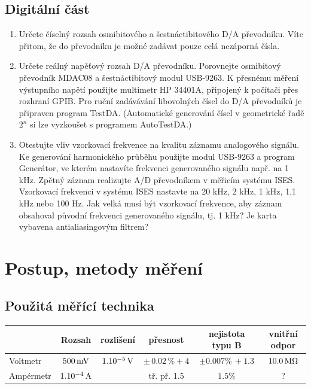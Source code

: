 \documentclass[czech,11pt,a4paper]{article}
\begin{document}
	\subsection{Digitální část}
		\begin{enumerate}
			\item Určete číselný rozsah osmibitového a šestnáctibitového D/A převodníku. Víte přitom, že do
			převodníku je možné zadávat pouze celá nezáporná čísla.
			\item Určete reálný napěťový rozsah D/A převodníku.
			Porovnejte osmibitový převodník MDAC08 a šestnáctibitový modul USB-9263. K přesnému
			měření výstupního napětí použijte multimetr HP 34401A, připojený k počítači přes rozhraní
			GPIB. Pro ruční zadávávání libovolných čísel do D/A převodníků je připraven program
			TestDA. (Automatické generování čísel v geometrické řadě $2^n$ si lze vyzkoušet s programem
			AutoTestDA.)
			\item Otestujte vliv vzorkovací frekvence na kvalitu záznamu analogového signálu. Ke generování
			harmonického průběhu použijte modul USB-9263 a program Generátor, ve kterém nastavíte
			frekvenci generovaného signálu např. na 1 kHz. Zpětný záznam realizujte A/D převodníkem
			v měřicím systému ISES. Vzorkovací frekvenci v systému ISES nastavte na 20 kHz, 2 kHz,
			1 kHz, 1,1 kHz nebo 100 Hz. Jak velká musí být vzorkovací frekvence, aby záznam obsahoval původní frekvenci generovaného signálu, tj. 1 kHz? Je karta vybavena antialiasingovým
			filtrem?
		\end{enumerate}
	
	
	
	\section{Postup, metody měření}
	
	\subsection{Použitá měřící technika}
	
	
		\begin{center}
			
			\begin{tabular}{||l|c|c|c|c|c||}
				\hline
				& Rozsah & rozlišení & přesnost & nejistota typu B & vnitřní odpor\\
				\hline
				{Voltmetr} &$500  \,\rm mV $& $1 . 10^{-5} \,\rm V$  & $\pm \, 0.02\, \%   +4$ &$\pm 0. 007\% \, + 1.3$&$10.0 \,\rm M \Omega$ \\
				\hline
				{Ampérmetr}  & $1.10^{-4} \,\rm A$ &   & tř. př. 1.5 & $1.5 \% $& ? \\
				\hline
				
			\end{tabular}
		\end{center}
		
\end{document}
